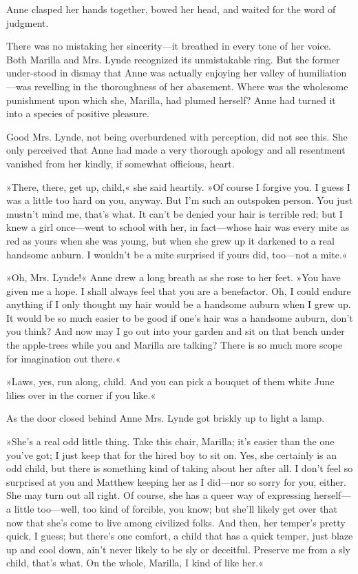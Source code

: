 Anne clasped her hands together, bowed her head, and waited for the word of judgment.

There was no mistaking her sincerity—it breathed in every tone of her voice. Both Marilla and Mrs. Lynde recognized its unmistakable ring. But the former under-stood in dismay that Anne was actually enjoying her valley of humiliation—was revelling in the thoroughness of her abasement. Where was the wholesome punishment upon which she, Marilla, had plumed herself? Anne had turned it into a species of positive pleasure.

Good Mrs. Lynde, not being overburdened with perception, did not see this. She only perceived that Anne had made a very thorough apology and all resentment vanished from her kindly, if somewhat officious, heart.

»There, there, get up, child,« she said heartily. »Of course I forgive you. I guess I was a little too hard on you, anyway. But I'm such an outspoken person. You just mustn't mind me, that's what. It can't be denied your hair is terrible red; but I knew a girl once—went to school with her, in fact—whose hair was every mite as red as yours when she was young, but when she grew up it darkened to a real handsome auburn. I wouldn't be a mite surprised if yours did, too—not a mite.«

»Oh, Mrs. Lynde!« Anne drew a long breath as she rose to her feet. »You have given me a hope. I shall always feel that you are a benefactor. Oh, I could endure anything if I only thought my hair would be a handsome auburn when I grew up. It would be so much easier to be good if one's hair was a handsome auburn, don't you think? And now may I go out into your garden and sit on that bench under the apple-trees while you and Marilla are talking? There is so much more scope for imagination out there.«

»Laws, yes, run along, child. And you can pick a bouquet of them white June lilies over in the corner if you like.«

As the door closed behind Anne Mrs. Lynde got briskly up to light a lamp.

»She's a real odd little thing. Take this chair, Marilla; it's easier than the one you've got; I just keep that for the hired boy to sit on. Yes, she certainly is an odd child, but there is something kind of taking about her after all. I don't feel so surprised at you and Matthew keeping her as I did—nor so sorry for you, either. She may turn out all right. Of course, she has a queer way of expressing herself—a little too—well, too kind of forcible, you know; but she'll likely get over that now that she's come to live among civilized folks. And then, her temper's pretty quick, I guess; but there's one comfort, a child that has a quick temper, just blaze up and cool down, ain't never likely to be sly or deceitful. Preserve me from a sly child, that's what. On the whole, Marilla, I kind of like her.«

